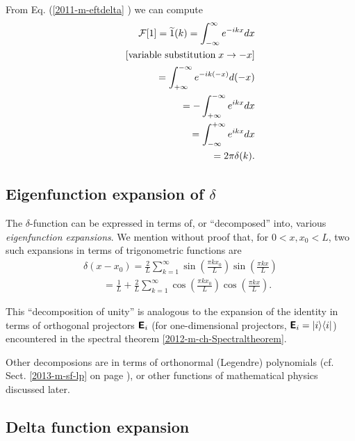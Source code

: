 From Eq. (\ref{2011-m-eftdelta} ) we can compute
\begin{equation}
\begin{split}
{\cal F}[1]=\widetilde{1}(k)=   \int_{-\infty}^\infty    e^{-i{kx}} dx   \\
\qquad [\textrm{variable substitution}\; x \rightarrow -x]\\
\qquad =   \int_{+\infty}^{-\infty}    e^{-i{k(-x)}} d(-x)   \\
\qquad =  - \int_{+\infty}^{-\infty}    e^{i{kx}} dx   \\
\qquad =    \int_{-\infty}^{+\infty}    e^{i{kx}} dx   \\
\qquad =    2\pi \delta (k)
.
\end{split}
\label{2011-m-eftdelta1}
\end{equation}


\subsection{Eigenfunction expansion of $\delta$}
\label{2012-m-efed1}

The  $\delta$-function can be expressed  in terms of, or ``decomposed'' into, various
{\em eigenfunction expansions}.
We mention without proof
\cite{duffy2001} that, for $0< x,x_0 <L$,
two such expansions in terms of trigonometric functions are
\begin{equation}
\begin{split}
\delta (x-x_0) =
\frac{2}{L}
\sum_{k=1}^\infty
\sin \left( \frac{\pi k x_0}{L}\right)
\sin \left( \frac{\pi k x}{L}\right)\\
\qquad  =
\frac{1}{L}
+
\frac{2}{L}
\sum_{k=1}^\infty
\cos \left( \frac{\pi k x_0}{L}\right)
\cos \left( \frac{\pi k x}{L}\right).
\end{split}
\label{2012-m-efed}
\end{equation}

This ``decomposition of unity'' is analogous to the expansion of the identity in terms of orthogonal projectors
$\textsf{\textbf{E}}_i$  (for one-dimensional projectors, $\textsf{\textbf{E}}_i=\vert i\rangle \langle i \vert $)
encountered in the spectral theorem \ref{2012-m-ch-Spectraltheorem}.

Other decomposions are in terms of orthonormal (Legendre) polynomials (cf. Sect. \ref{2013-m-sf-lp} on page \pageref{2013-m-sf-lp}),
or other functions of mathematical physics discussed later.

\subsection{Delta function expansion}
\label{2012-m-dfex}


